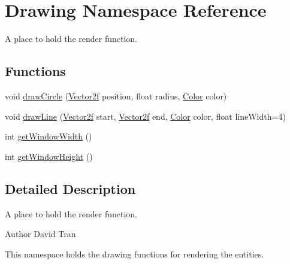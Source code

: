 \hypertarget{namespaceDrawing}{\section{Drawing Namespace Reference}
\label{namespaceDrawing}
}


A place to hold the render function.  


\subsection*{Functions}
\begin{DoxyCompactItemize}
\item 
void \hyperlink{namespaceDrawing_a18600f6b38e0e9fd5ca4d14d2c6c65f8}{draw\-Circle} (\hyperlink{classVector2}{Vector2f} position, float radius, \hyperlink{classColor}{Color} color)
\item 
void \hyperlink{namespaceDrawing_abf48d4f58682687283db03dd4af75c50}{draw\-Line} (\hyperlink{classVector2}{Vector2f} start, \hyperlink{classVector2}{Vector2f} end, \hyperlink{classColor}{Color} color, float line\-Width=4)
\item 
int \hyperlink{namespaceDrawing_aad23f577b63b549618750ebdad254ad3}{get\-Window\-Width} ()
\item 
int \hyperlink{namespaceDrawing_ae71c3e98ec705d2fc14f87c41f082324}{get\-Window\-Height} ()
\end{DoxyCompactItemize}


\subsection{Detailed Description}
A place to hold the render function. \begin{DoxyAuthor}{Author}
David Tran
\end{DoxyAuthor}
This namespace holds the drawing functions for rendering the entities. 

